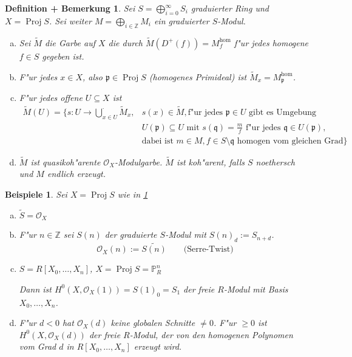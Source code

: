 \documentclass[paper = A4, fontsize=12pt, numbers=noendperiod, chapterprefix=true]{scrbook}
\theoremstyle{break}
\newtheorem{DefBem}[Def]{Definition + Bemerkung}
\theoremstyle{nonumberbreak}
\newtheorem{bspe}{Beispiele}
\theoremstyle{nonumberplain}
\DeclareMathOperator{\Proj}{Proj}
\newcommand{\IP}{\mathbb{P}}%
\newcommand{\Z}{\mathbb{Z}}
\newcommand{\calO}{\mathcal{O}}
\newcommand{\p}{\mathfrak{p}} %
\newcommand{\q}{\mathfrak{q}} %
\begin{document}
\begin{DefBem}\label{15.1}
Sei $S = \bigoplus\limits_{i = 0}^\infty S_i$ graduierter Ring und $X = \Proj S$. Sei weiter $M = \bigoplus\limits_{i \in \Z} M_i$ ein graduierter $S$-Modul.
\begin{enumerate}[a)]
\item
	Sei $\tilde M$ die Garbe auf $X$ die durch $\tilde M(D^+(f)) = M_f^{\hom}$ f"ur jedes homogene $f \in S$ gegeben ist.
\item
	F"ur jedes $x \in X$, also $\p \in \Proj S$ (homogenes Primideal) ist $\tilde M_x = M_\p^{\hom}$.
\item
	F"ur jedes offene $U \subseteq X$ ist
		\[\begin{array}{rl} \tilde M(U) = \{s: U \to \bigcup\limits_{x \in U}^\cdot \tilde M_x,& s(x) \in \tilde M, \text{f"ur jedes } \p \in U \text{ gibt es Umgebung}\\
			&U(\p) \subseteq U \text{ mit } s(\q) = \frac{m}{f} \text{ f"ur jedes } \q \in U(\p),\\
			&\text{dabei ist } m \in M, f \in S \setminus \q	\text{ homogen vom gleichen Grad}\}\end{array}\]
\item
	$\tilde M$ ist quasikoh"arente $\calO_X$-Modulgarbe. $\tilde M$ ist koh"arent, falls $S$ noethersch und $M$ endlich erzeugt.
\end{enumerate}\end{DefBem}

\begin{bspe}
Sei $X = \Proj S$ wie in \ref{15.1}
\begin{enumerate}[a)]
\item
	$\tilde S = \calO_X$
\item
	F"ur $n \in \Z$ sei $S(n)$ der graduierte $S$-Modul mit $S(n)_d := S_{n+d}$.
		\[ \calO_X(n) := \widetilde{S(n)} \qquad \text{(Serre-Twist)} \]
\item
	$S = R[X_0,\ldots ,X_n]$, $X = \Proj S = \IP_R^n$
	
	Dann ist $H^0(X, \calO_X(1)) = S(1)_0 = S_1$ der freie $R$-Modul mit Basis $X_0,\ldots ,X_n$.
\item
	F"ur $d < 0$ hat $\calO_X(d)$ keine globalen Schnitte $\ne 0$. F"ur $ \ge 0$ ist $H^0(X, \calO_X(d))$ der freie $R$-Modul, der von den homogenen Polynomen vom Grad $d$ in $R[X_0,\ldots ,X_n]$ erzeugt wird.
\end{enumerate}\end{bspe}
\end{document}
